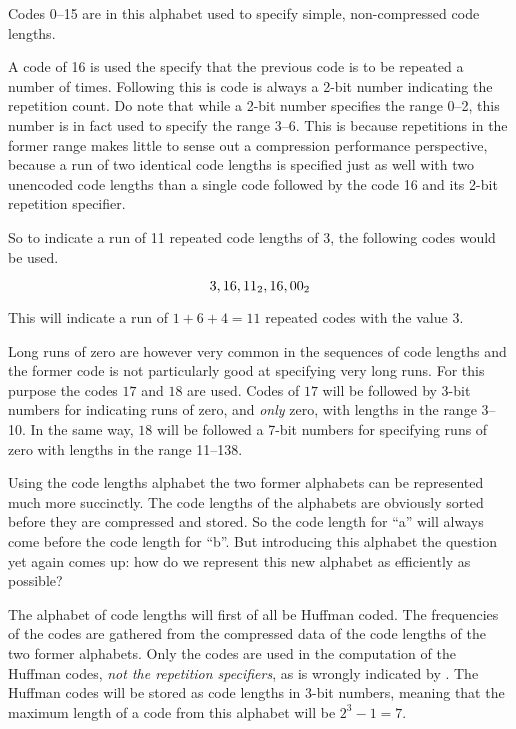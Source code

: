 Codes 0--15 are in this alphabet used to specify simple,
non-compressed code lengths.

A code of 16 is used the specify that the previous code is to be
repeated a number of times. Following this is code is always a 2-bit
number indicating the repetition count. Do note that while a 2-bit
number specifies the range 0--2, this number is in fact used to specify
the range 3--6. This is because repetitions in the former range makes
little to sense out a compression performance perspective, because a
run of two identical code lengths is specified just as well with two
unencoded code lengths than a single code followed by the code 16 and
its 2-bit repetition specifier.

So to indicate a run of 11 repeated code lengths of $3$, the following
codes would be used.

\begin{equation*}
  3, 16, \mbox{\ensuremath{11_2}}, 16, \mbox{\ensuremath{00_2}}
\end{equation*}

This will indicate a run of $1 + 6 + 4 = 11$ repeated codes with the
value $3$.

Long runs of zero are however very common in the sequences of code
lengths and the former code is not particularly good at specifying
very long runs. For this purpose the codes $17$ and $18$ are
used. Codes of $17$ will be followed by 3-bit numbers for indicating
runs of zero, and \textit{only} zero, with lengths in the range
3--10. In the same way, $18$ will be followed a 7-bit numbers for
specifying runs of zero with lengths in the range 11--138.

Using the code lengths alphabet the two former alphabets can be
represented much more succinctly. The code lengths of the alphabets
are obviously sorted before they are compressed and stored. So the
code length for ``a'' will always come before the code length for
``b''. But introducing this alphabet the question yet again comes up:
how do we represent this new alphabet as efficiently as possible?

The alphabet of code lengths will first of all be Huffman coded. The
frequencies of the codes are gathered from the compressed data of the
code lengths of the two former alphabets. Only the codes are used in
the computation of the Huffman codes, \textit{not the repetition
  specifiers}, as is wrongly indicated by \cite{Salomon:2004:DCC}. The
Huffman codes will be stored as code lengths in 3-bit numbers, meaning
that the maximum length of a code from this alphabet will be $2^3 - 1
= 7$.

